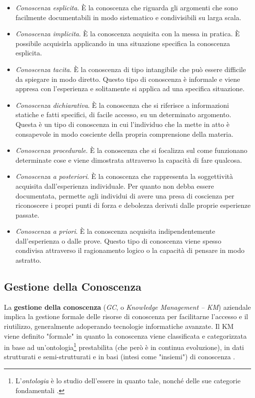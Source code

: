 \begin{itemize}
    \item \textit{Conoscenza esplicita}. È la conoscenza che riguarda gli argomenti che sono facilmente documentabili in modo sistematico e condivisibili su larga scala.
    \item \textit{Conoscenza implicita}. È la conoscenza acquisita con la messa in pratica. È possibile acquisirla applicando in una situazione specifica la conoscenza esplicita.
    \item \textit{Conoscenza tacita}. È la conoscenza di tipo intangibile che può essere difficile da spiegare in modo diretto. Questo tipo di conoscenza è informale e viene appresa con l’esperienza e solitamente si applica ad una specifica situazione. 
    \item \textit{Conoscenza dichiarativa}. È la conoscenza che si riferisce a informazioni statiche e fatti specifici, di facile accesso, su un determinato argomento. Questa è un tipo di conoscenza in cui l’individuo che la mette in atto è consapevole in modo cosciente della propria comprensione della materia.
    \item \textit{Conoscenza procedurale}. È la conoscenza che si focalizza sul come funzionano determinate cose e viene dimostrata attraverso la capacità di fare qualcosa.
    \item \textit{Conoscenza a posteriori}. È la conoscenza che rappresenta la soggettività acquisita dall'esperienza individuale. Per quanto non debba essere documentata, permette agli individui di avere una presa di coscienza per riconoscere i propri punti di forza e debolezza derivati dalle proprie esperienze passate.
    \item \textit{Conoscenza a priori}. È la conoscenza acquisita indipendentemente dall'esperienza o dalle prove. Questo tipo di conoscenza viene spesso condivisa attraverso il ragionamento logico o la capacità di pensare in modo astratto.
\end{itemize}

\subsection{Gestione della Conoscenza}

La \textbf{gestione della conoscenza} (\textit{GC}, o \textit{Knowledge Management – KM}) aziendale implica la gestione formale delle risorse di conoscenza per facilitarne l'accesso e il riutilizzo, generalmente adoperando tecnologie informatiche avanzate. Il KM viene definito "formale" in quanto la conoscenza viene classificata e categorizzata in base ad un'ontologia\footnote{L'\textit{ontologia} è lo studio dell'essere in quanto tale, nonché delle sue categorie fondamentali \cite{wikipedia_ontologia}.} prestabilita (che però è in continua evoluzione), in dati strutturati e semi-strutturati e in basi (intesi come "insiemi") di conoscenza \cite{overview_of_knowledge_management}.

